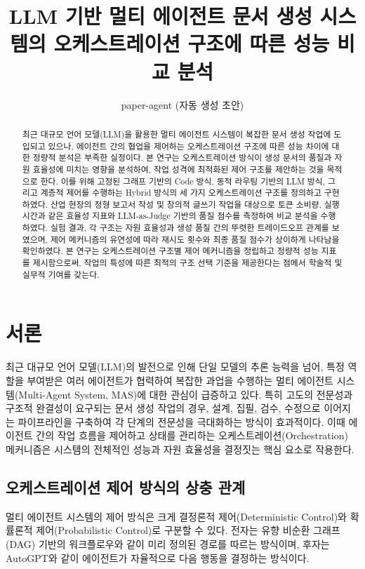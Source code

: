 \documentclass[10pt,twocolumn]{article}
\title{LLM 기반 멀티 에이전트 문서 생성 시스템의 오케스트레이션 구조에 따른 성능 비교 분석}
\author{paper-agent (자동 생성 초안)}
\date{}
\begin{document}
\maketitle

\begin{abstract}
최근 대규모 언어 모델(LLM)을 활용한 멀티 에이전트 시스템이 복잡한 문서 생성 작업에 도입되고 있으나, 에이전트 간의 협업을 제어하는 오케스트레이션 구조에 따른 성능 차이에 대한 정량적 분석은 부족한 실정이다. 본 연구는 오케스트레이션 방식이 생성 문서의 품질과 자원 효율성에 미치는 영향을 분석하여, 작업 성격에 최적화된 제어 구조를 제안하는 것을 목적으로 한다. 이를 위해 고정된 그래프 기반의 Code 방식, 동적 라우팅 기반의 LLM 방식, 그리고 계층적 제어를 수행하는 Hybrid 방식의 세 가지 오케스트레이션 구조를 정의하고 구현하였다. 산업 현장의 정형 보고서 작성 및 창의적 글쓰기 작업을 대상으로 토큰 소비량, 실행 시간과 같은 효율성 지표와 LLM-as-Judge 기반의 품질 점수를 측정하여 비교 분석을 수행하였다. 실험 결과, 각 구조는 자원 효율성과 생성 품질 간의 뚜렷한 트레이드오프 관계를 보였으며, 제어 메커니즘의 유연성에 따라 재시도 횟수와 최종 품질 점수가 상이하게 나타남을 확인하였다. 본 연구는 오케스트레이션 구조별 제어 메커니즘을 정립하고 정량적 성능 지표를 제시함으로써, 작업의 특성에 따른 최적의 구조 선택 기준을 제공한다는 점에서 학술적 및 실무적 기여를 갖는다.
\end{abstract}

\section{서론}
최근 대규모 언어 모델(LLM)의 발전으로 인해 단일 모델의 추론 능력을 넘어, 특정 역할을 부여받은 여러 에이전트가 협력하여 복잡한 과업을 수행하는 멀티 에이전트 시스템(Multi-Agent System, MAS)에 대한 관심이 급증하고 있다. 특히 고도의 전문성과 구조적 완결성이 요구되는 문서 생성 작업의 경우, 설계, 집필, 검수, 수정으로 이어지는 파이프라인을 구축하여 각 단계의 전문성을 극대화하는 방식이 효과적이다. 이때 에이전트 간의 작업 흐름을 제어하고 상태를 관리하는 오케스트레이션(Orchestration) 메커니즘은 시스템의 전체적인 성능과 자원 효율성을 결정짓는 핵심 요소로 작용한다.

\subsection{오케스트레이션 제어 방식의 상충 관계}

멀티 에이전트 시스템의 제어 방식은 크게 결정론적 제어(Deterministic Control)와 확률론적 제어(Probabilistic Control)로 구분할 수 있다. 전자는 유향 비순환 그래프(DAG) 기반의 워크플로우와 같이 미리 정의된 경로를 따르는 방식이며, 후자는 AutoGPT와 같이 에이전트가 자율적으로 다음 행동을 결정하는 방식이다. 
\end{document}
